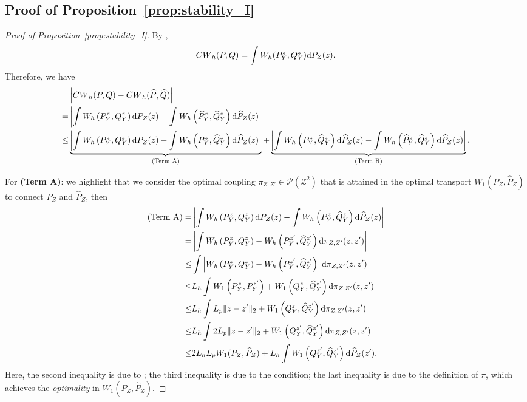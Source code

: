 \documentclass{article}
\theoremstyle{plain}
\theoremstyle{definition}
\def\PP{P}
\def\QQ{Q}
\def\calP{\mathcal{P}}
\def\calZ{\mathcal{Z}}
\theoremstyle{plain}
\newcommand{\diff}{{\rm d}}
\def\calP{\mathcal{P}}
\def\calZ{\mathcal{Z}}
\newcommand{\Cwass}{{CW}}
\begin{document}
\subsection{Proof of Proposition~\ref{prop:stability_I}}
\begin{proof}[Proof of Proposition~\ref{prop:stability_I}]
    By \cite[Proposition 2]{lin2025estimation},
    \[
        \Cwass_h(\PP, \QQ) = \int W_h(\PP^z_Y, \QQ^z_Y) \diff  \PP_Z(z).
    \]
    Therefore, we have
    \[
        \begin{aligned}
            & \left|\Cwass_h(\PP, \QQ) - \Cwass_h(\widehat \PP, \widehat \QQ)\right|\\
            = & \left|\int W_{h}\left(\PP_{Y}^{z}, \QQ_{Y}^{z}\right) \diff \PP_{Z}(z) - \int W_{h}\left(\widehat \PP_Y^{z}, \widehat \QQ_Y^{z}\right) \diff \widehat \PP_Z(z)\right|\\ 
            \leq & \underbrace{\left|\int W_{h}\left(\PP_Y^{z}, \QQ_Y^{z}\right) \diff \PP_Z(z) - \int W_{h}\left(\PP_Y^{z}, \widehat \QQ_Y^{z}\right) \diff \widehat \PP_Z(z)\right|}_{\text{(Term A)}} +  \underbrace{\left|\int W_{h}\left(\PP_Y^{z}, \widehat \QQ_Y^{z}\right) \diff \widehat \PP_Z(z) - \int W_{h}\left(\widehat \PP_Y^{z}, \widehat \QQ_Y^{z}\right) \diff \widehat \PP_Z(z) \right|}_{\text{(Term B)}}.
        \end{aligned}
    \]
    
    For \textbf{(Term A)}: we highlight that we consider the optimal coupling $\pi_{Z, Z'} \in \calP(\calZ^2)$ that is attained in the optimal transport $W_{1}(\PP_{Z}, \widehat \PP_Z)$ to connect $\PP_Z$ and $\widehat \PP_Z$, then 
    \[
        \begin{aligned}
            (\text{Term A}) = &\left|\int W_{h}\left(\PP_Y^{z}, \QQ_Y^{z}\right) \diff \PP_Z(z) - \int W_{h}\left(\PP_Y^{z}, \widehat \QQ_Y^{z}\right) \diff \widehat \PP_Z(z)\right|\\
            = & \left|\int W_{h}\left(\PP_Y^{z}, \QQ_Y^{z}\right) -  W_{h}\left(\PP_Y^{z'}, \widehat \QQ_Y^{z'}\right) \diff \pi_{Z, Z'}(z, z')\right|\\
            \leq & \int \left|W_{h}\left(\PP_Y^{z}, \QQ_Y^{z}\right) -  W_{h}\left(\PP_Y^{z'}, \widehat \QQ_Y^{z'}\right) \right|\diff \pi_{Z, Z'}(z, z')\\
            \leq & L_h \int W_{1}\left(\PP_Y^{z}, \PP_Y^{z'}\right) + W_{1}\left(\QQ_Y^{z}, \widehat \QQ_Y^{z'}\right) \diff \pi_{Z, Z'}(z, z')\\
            \leq & L_h \int L_p \|z - z'\|_2  + W_{1}\left(\QQ_Y^{z}, \widehat \QQ_Y^{z'}\right) \diff \pi_{Z, Z'}(z, z')\\
            \leq & L_h \int 2 L_p \|z - z'\|_2  + W_{1}\left(\QQ_Y^{z'}, \widehat \QQ_Y^{z'}\right) \diff \pi_{Z, Z'}(z, z')\\
            \leq & 2 L_h L_p W_1(\PP_Z, \widehat \PP_Z) + L_h \int W_{1}\left(\QQ_Y^{z'}, \widehat \QQ_Y^{z'}\right) \diff \widehat \PP_{Z}(z').
        \end{aligned}
    \]
    Here, the second inequality is due to \cite[Lemma 5]{lin2025estimation}; the third inequality is due to the condition; the last inequality is due to the definition of $\pi$, which achieves the \textit{optimality} in $W_{1}(\PP_{Z}, \widehat \PP_Z)$.


\end{proof}
\end{document}
